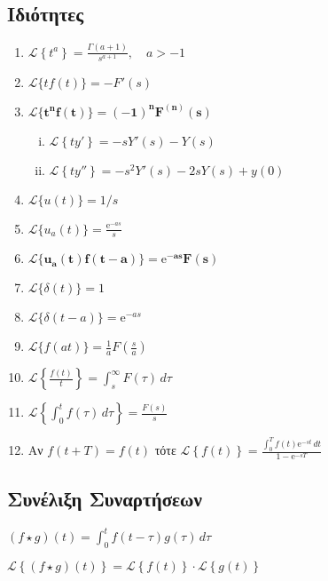\documentclass[a4paper]{report}
\begin{document}
{  \subsection*{Ιδιότητες}
  \begin{enumerate}
    \item $ \mathcal{L}\left\{t^{a}\right\} = \frac{\Gamma{(a+1)}}{s^{a+1}}, \quad a>-1 $
    \item $ \mathcal{L}\{tf(t)\} = -F'(s) $
    \item $ \bm{\mathcal{L}\{t^{n}f(t)\} = (-1)^{n} F^{(n)}(s)} $
      \begin{enumerate}[i)]
        \item $ \mathcal{L}\left\{ty'\right\} = -sY'(s)-Y(s) $ 
        \item $ \mathcal{L}\left\{ty''\right\} = -s^{2}Y'(s)-2sY(s)+y(0) $ 
      \end{enumerate}
    \item $ \mathcal{L}\{u(t)\} = {1}/{s}$
    \item $ \mathcal{L}\{u_{a}(t)\} = \frac{\mathrm{e}^{-as}}{s}$
    \item $ \bm{\mathcal{L}\{u_{a}(t)f(t-a)\} = \mathrm{e}^{-as}F(s)}$
    \item $ \mathcal{L}\{\delta(t)\} = 1 $
    \item $ \mathcal{L}\{\delta(t-a)\} = \mathrm{e}^{-as} $
    \item $ \mathcal{L}\{f(at)\} = \frac{1}{a} F\left(\frac{s}{a}\right) $
    \item $ \mathcal{L}\left\{\frac{f(t)}{t} \right\} = \int\nolimits _{s}^{\infty} 
      F(\tau) \,{d\tau} $
    \item $ \mathcal{L}\left\{\int\nolimits _{0}^{t} f(\tau) \,{d\tau}\right\} = 
      \frac{F(s)}{s} $
    \item Αν $ f(t+T)=f(t) $ τότε $ \mathcal{L}\left\{f(t)\right\} = \frac{\int _{0}^{T}
        f(t) \mathrm{e}^{-st}
      \,{dt}}{1- \mathrm{e}^{-sT}} $
  \end{enumerate}

  \subsection*{Συνέλιξη Συναρτήσεων}

  \begin{myitemize}
    \item $ (f\star g)(t) = \int _{0}^{t} f(t-\tau) g(\tau) \,{d\tau} $ 
    \item $ \mathcal{L}\left\{(f\star g)(t)\right\} = \mathcal{L}\left\{f(t)\right\}
      \cdot \mathcal{L}\left\{g(t)\right\} $
  \end{myitemize}

}
\end{document}
